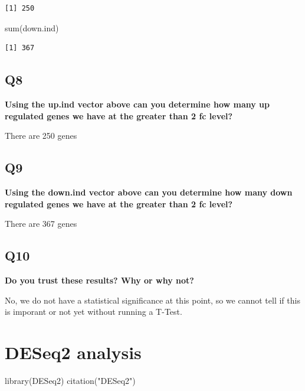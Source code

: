 \documentclass[
  letterpaper,
  DIV=11,
  numbers=noendperiod]{scrartcl}
\newenvironment{Shaded}{\begin{snugshade}}{\end{snugshade}}
\newcommand{\FunctionTok}[1]{\textcolor[rgb]{0.28,0.35,0.67}{#1}}
\newcommand{\NormalTok}[1]{\textcolor[rgb]{0.00,0.23,0.31}{#1}}
\newcommand{\StringTok}[1]{\textcolor[rgb]{0.13,0.47,0.30}{#1}}
\begin{document}
\begin{verbatim}
[1] 250
\end{verbatim}

\begin{Shaded}
\begin{Highlighting}[]
\FunctionTok{sum}\NormalTok{(down.ind)}
\end{Highlighting}
\end{Shaded}

\begin{verbatim}
[1] 367
\end{verbatim}

\hypertarget{q8}{%
\subsection{\texorpdfstring{\textbf{Q8}}{Q8}}\label{q8}}

\textbf{Using the up.ind vector above can you determine how many up
regulated genes we have at the greater than 2 fc level?}

There are 250 genes

\hypertarget{q9}{%
\subsection{\texorpdfstring{\textbf{Q9}}{Q9}}\label{q9}}

\textbf{Using the down.ind vector above can you determine how many down
regulated genes we have at the greater than 2 fc level?}

There are 367 genes

\hypertarget{q10}{%
\subsection{\texorpdfstring{\textbf{Q10}}{Q10}}\label{q10}}

\textbf{Do you trust these results? Why or why not?}

No, we do not have a statistical significance at this point, so we
cannot tell if this is imporant or not yet without running a T-Test.

\hypertarget{deseq2-analysis}{%
\section{DESeq2 analysis}\label{deseq2-analysis}}

\begin{Shaded}
\begin{Highlighting}[]
\FunctionTok{library}\NormalTok{(DESeq2)}
\FunctionTok{citation}\NormalTok{(}\StringTok{"DESeq2"}\NormalTok{)}
\end{Highlighting}
\end{Shaded}
\end{document}

